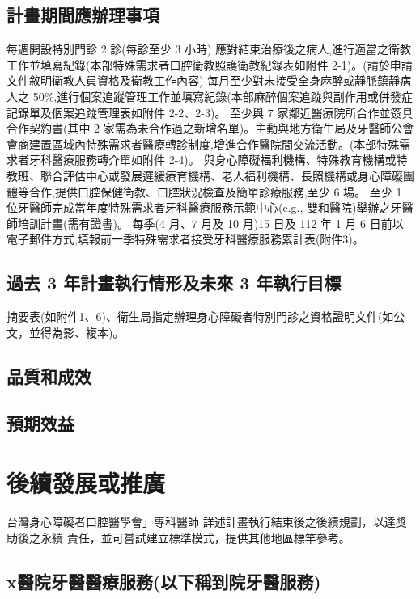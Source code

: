 \subsection{計畫期間應辦理事項}

\begin{outline}
\1 每週開設特別門診 2 診(每診至少 3 小時)
\1 應對結束治療後之病人,進行適當之衛教工作並填寫紀錄(本部特殊需求者口腔衛教照護衛教紀錄表如附件 2-1)。(請於申請文件敘明衛教人員資格及衛教工作內容)
\1 每月至少對未接受全身麻醉或靜脈鎮靜病人之 50\%,進行個案追蹤管理工作並填寫紀錄(本部麻醉個案追蹤與副作用或併發症記錄單及個案追蹤管理表如附件 2-2、2-3)。
\1 至少與 7 家鄰近醫療院所合作並簽具合作契約書(其中 2 家需為未合作過之新增名單)。主動與地方衛生局及牙醫師公會會商建置區域內特殊需求者醫療轉診制度,增進合作醫院間交流活動。(本部特殊需求者牙科醫療服務轉介單如附件 2-4)。
\1 與身心障礙福利機構、特殊教育機構或特教班、聯合評估中心或發展遲緩療育機構、老人福利機構、長照機構或身心障礙團體等合作,提供口腔保健衛教、口腔狀況檢查及簡單診療服務,至少 6 場。
\1 至少 1 位牙醫師完成當年度特殊需求者牙科醫療服務示範中心(e.g., 雙和醫院)舉辦之牙醫師培訓計畫(需有證書)。
\1 每季(4 月、7 月及 10 月)15 日及 112 年 1 月 6 日前以電子郵件方式,填報前一季特殊需求者接受牙科醫療服務累計表(附件3)。


\end{outline}

\subsection{過去 3 年計畫執行情形及未來 3 年執行目標}
摘要表(如附件1、6)、衛生局指定辦理身心障礙者特別門診之資格證明文件(如公文，並得為影、複本)。
\subsection{品質和成效}

\subsection{預期效益}


\section{後續發展或推廣}
台灣身心障礙者口腔醫學會」專科醫師
詳述計畫執行結束後之後續規劃，以達獎助後之永續 責任，並可嘗試建立標準模式，提供其他地區標竿參考。

\subsection{x醫院牙醫醫療服務(以下稱到院牙醫服務)}
\label{dent}

